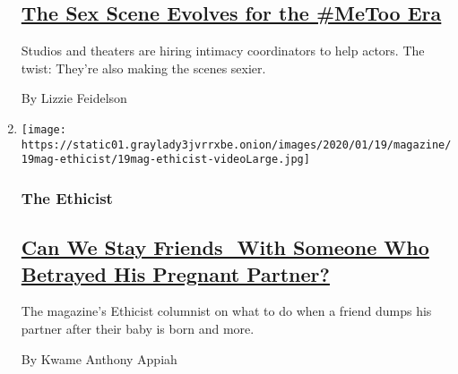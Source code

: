 \begin{enumerate}
{  \subsection{\texorpdfstring{\href{/2020/01/14/magazine/sex-scene-intimacy-coordinator.html}{The
  Sex Scene Evolves for the \#MeToo
  Era}}{The Sex Scene Evolves for the \#MeToo Era}}\label{the-sex-scene-evolves-for-the-metoo-era}}

  Studios and theaters are hiring intimacy coordinators to help actors.
  The twist: They're also making the scenes sexier.

  By Lizzie Feidelson
\item
  \texttt{[image: https://static01.graylady3jvrrxbe.onion/images/2020/01/19/magazine/19mag-ethicist/19mag-ethicist-videoLarge.jpg]}

  \hypertarget{the-ethicist}{%
  \subsubsection{The Ethicist}\label{the-ethicist}}

  \hypertarget{can-we-stay-friends-with-someone-who-betrayed-his-pregnant-partner}{%
  \subsection{\texorpdfstring{\href{/2020/01/14/magazine/can-we-stay-friends-with-someone-who-betrayed-his-pregnant-partner.html}{Can
  We Stay Friends  With Someone Who Betrayed His Pregnant
  Partner?}}{Can We Stay Friends  With Someone Who Betrayed His Pregnant Partner?}}\label{can-we-stay-friends-with-someone-who-betrayed-his-pregnant-partner}}

  The magazine's Ethicist columnist on what to do when a friend dumps
  his partner after their baby is born and more.

  By Kwame Anthony Appiah
\end{enumerate}

